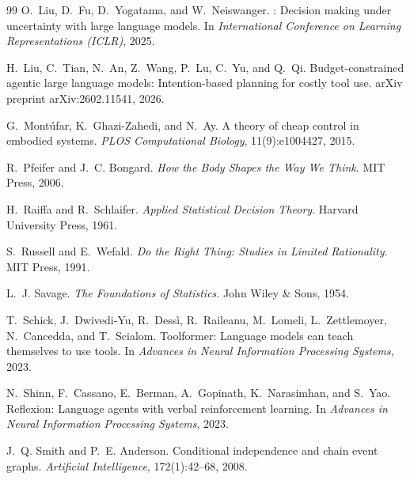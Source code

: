 \documentclass[11pt]{article}
\begin{document}
\begin{thebibliography}{99}
O.~Liu, D.~Fu, D.~Yogatama, and W.~Neiswanger.
: Decision making under uncertainty with large language models.
\newblock In \emph{International Conference on Learning Representations (ICLR)}, 2025.

H.~Liu, C.~Tian, N.~An, Z.~Wang, P.~Lu, C.~Yu, and Q.~Qi.
\newblock Budget-constrained agentic large language models: Intention-based planning for costly tool use.
\newblock arXiv preprint arXiv:2602.11541, 2026.

G.~Mont\'{u}far, K.~Ghazi-Zahedi, and N.~Ay.
\newblock A theory of cheap control in embodied systems.
\newblock \emph{PLOS Computational Biology}, 11(9):e1004427, 2015.

R.~Pfeifer and J.~C. Bongard.
\newblock \emph{How the Body Shapes the Way We Think}.
\newblock MIT Press, 2006.

H.~Raiffa and R.~Schlaifer.
\newblock \emph{Applied Statistical Decision Theory}.
\newblock Harvard University Press, 1961.

S.~Russell and E.~Wefald.
\newblock \emph{Do the Right Thing: Studies in Limited Rationality}.
\newblock MIT Press, 1991.

L.~J. Savage.
\newblock \emph{The Foundations of Statistics}.
\newblock John Wiley \& Sons, 1954.

T.~Schick, J.~Dwivedi-Yu, R.~Dess\`{i}, R.~Raileanu, M.~Lomeli, L.~Zettlemoyer, N.~Cancedda, and T.~Scialom.
\newblock Toolformer: Language models can teach themselves to use tools.
\newblock In \emph{Advances in Neural Information Processing Systems}, 2023.

N.~Shinn, F.~Cassano, E.~Berman, A.~Gopinath, K.~Narasimhan, and S.~Yao.
\newblock Reflexion: Language agents with verbal reinforcement learning.
\newblock In \emph{Advances in Neural Information Processing Systems}, 2023.

J.~Q. Smith and P.~E. Anderson.
\newblock Conditional independence and chain event graphs.
\newblock \emph{Artificial Intelligence}, 172(1):42--68, 2008.


\end{thebibliography}
\end{document}
